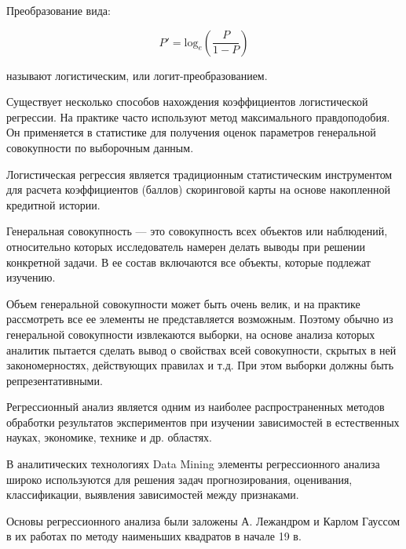 Преобразование вида:

\begin{equation}
	{P'} =  \text{log}_{e}(\frac{P}{1-P})
\end{equation}

называют логистическим, или логит-преобразованием.

Существует несколько способов нахождения коэффициентов логистической регрессии. На практике часто используют метод
максимального правдоподобия. Он применяется в статистике для получения оценок параметров генеральной совокупности по
выборочным данным.

Логистическая регрессия является традиционным статистическим инструментом для расчета коэффициентов (баллов) скоринговой
карты на основе накопленной кредитной истории.

Генеральная совокупность — это совокупность всех объектов или наблюдений, относительно которых исследователь намерен
делать выводы при решении конкретной задачи. В ее состав включаются все объекты, которые подлежат изучению.

Объем генеральной совокупности может быть очень велик, и на практике рассмотреть все ее элементы не представляется
возможным. Поэтому обычно из генеральной совокупности извлекаются выборки, на основе анализа которых аналитик пытается
сделать вывод о свойствах всей совокупности, скрытых в ней закономерностях, действующих правилах и т.д. При этом выборки
должны быть репрезентативными.

Регрессионный анализ является одним из наиболее распространенных методов обработки результатов экспериментов при
изучении зависимостей в естественных науках, экономике, технике и др. областях.

В аналитических технологиях Data Mining элементы регрессионного анализа широко используются для решения задач
прогнозирования, оценивания, классификации, выявления зависимостей между признаками.

Основы регрессионного анализа были заложены А. Лежандром и Карлом Гауссом в их работах по методу наименьших квадратов в
начале 19 в.~\cite{regression_analysis}
